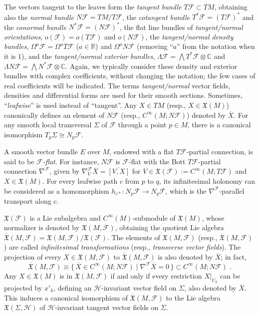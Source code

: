 \documentclass{memo-l}
\theoremstyle{plain}
\theoremstyle{definition}
\theoremstyle{remark}
\newcommand{\C}{\mathbb{C}}
\newcommand{\R}{\mathbb{R}}
\newcommand{\FF}{\mathcal{F}}
\newcommand{\HH}{\mathcal{H}}
\newcommand{\fX}{\mathfrak{X}}
\newcommand{\olfX}{\overline{\fX}}
\numberwithin{section}{chapter}
\numberwithin{equation}{section}%
\begin{document}
The vectors tangent to the leaves form the \emph{tangent bundle} $T\FF\subset TM$, obtaining also the \emph{normal bundle} $N\FF=TM/T\FF$, the  \emph{cotangent bundle} $T^*\FF=(T\FF)^*$ and the \emph{conormal bundle} $N^*\FF=(N\FF)^*$, the flat line bundles of \emph{tangent/normal orientations}, $o(\FF)=o(T\FF)$ and $o(N\FF)$, the \emph{tangent/normal density bundles}, $\Omega^a\FF=\Omega^aT\FF$ ($a\in\R$) and $\Omega^aN\FF$ (removing ``$a$'' from the notation when it is $1$), and the \emph{tangent/normal exterior bundles}, $\Lambda\FF=\bigwedge T^*\FF\otimes\C$ \index{$\Lambda\FF$} and $\Lambda N\FF=\bigwedge N^*\FF\otimes\C$. \index{$\Lambda N\FF$} Again, we typically consider these density and exterior bundles with complex coefficients, without changing the notation; the few cases of real coefficients will be indicated. The terms \emph{tangent/normal} vector fields, densities and differential forms are used for their smooth sections. Sometimes, ``\emph{leafwise}'' is used instead of ``tangent''. Any $X\in TM$ (resp., $X\in\fX(M)$) canonically defines an element of $N\FF$ (resp., $C^\infty(M;N\FF)$) denoted by $\overline{X}$. For any smooth local transversal $\Sigma$ of $\FF$ through a point $p\in M$, there is a canonical isomorphism $T_p\Sigma\cong N_p\FF$.

A smooth vector bundle $E$ over $M$, endowed with a flat $T\FF$-partial connection, is said to be {\em$\FF$-flat}. For instance, $N\FF$ is $\FF$-flat with the Bott $T\FF$-partial connection $\nabla^\FF$, given by $\nabla^\FF_V\overline{X}=\overline{[V,X]}$ for $V\in\fX(\FF):=C^\infty(M;T\FF)$ \index{$\fX(\FF)$} and $X\in\fX(M)$. For every leafwise path $c$ from $p$ to $q$, its infinitesimal holonomy can be considered as a homomorphism $h_{c*}:N_p\FF\to N_q\FF$, which is the $\nabla^\FF$-parallel transport along $c$.

$\fX(\FF)$ is a Lie subalgebra and $C^\infty(M)$-submodule of $\fX(M)$, whose normalizer is denoted by $\fX(M,\FF)$, \index{$\fX(M,\FF)$} obtaining the quotient Lie algebra $\olfX(M,\FF)=\fX(M,\FF)/\fX(\FF)$. \index{$\olfX(M,\FF)$} The elements of $\fX(M,\FF)$ (resp., $\olfX(M,\FF)$) are called \emph{infinitesimal transformations} (resp., \emph{transverse vector fields}). The projection of every $X\in\fX(M,\FF)$ to $\olfX(M,\FF)$ is also denoted by $\overline{X}$; in fact, 
\[
\olfX(M,\FF)\equiv\{\,\overline X\in C^\infty(M;N\FF)\mid\nabla^\FF\overline X=0\,\}\subset C^\infty(M;N\FF)\;. 
\]
Any $X\in\fX(M)$ is in $\fX(M,\FF)$ if and only if every restriction $X|_{U_k}$ can be projected by $x'_k$, defining an $\HH$-invariant vector field on $\Sigma$, also denoted by $\overline X$. This induces a canonical isomorphism of $\olfX(M,\FF)$ to the Lie algebra $\fX(\Sigma,\HH)$ \index{$\fX(\Sigma,\HH)$} of $\HH$-invariant tangent vector fields on $\Sigma$.
\end{document}
